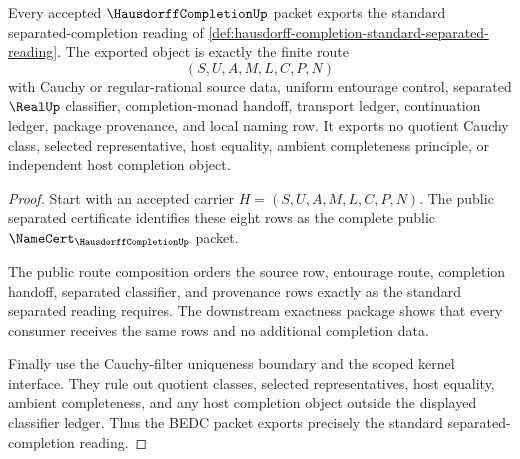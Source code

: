 \begin{theorem}
\label{thm:hausdorff-completion-bedc-to-standard-separated-bridge}
Every accepted $\HausdorffCompletionUp$ packet exports the standard separated-completion reading of \autoref{def:hausdorff-completion-standard-separated-reading}. The exported object is exactly the finite route
$$
(S,U,A,M,L,C,P,N)
$$
with Cauchy or regular-rational source data, uniform entourage control, separated $\RealUp$ classifier, completion-monad handoff, transport ledger, continuation ledger, package provenance, and local naming row. It exports no quotient Cauchy class, selected representative, host equality, ambient completeness principle, or independent host completion object.
\end{theorem}
\begin{proof}
Start with an accepted carrier $H=(S,U,A,M,L,C,P,N)$. The public separated certificate identifies these eight rows as the complete public $\NameCert_{\HausdorffCompletionUp}$ packet.

The public route composition orders the source row, entourage route, completion handoff, separated classifier, and provenance rows exactly as the standard separated reading requires. The downstream exactness package shows that every consumer receives the same rows and no additional completion data.

Finally use the Cauchy-filter uniqueness boundary and the scoped kernel interface. They rule out quotient classes, selected representatives, host equality, ambient completeness, and any host completion object outside the displayed classifier ledger. Thus the BEDC packet exports precisely the standard separated-completion reading.
\end{proof}

